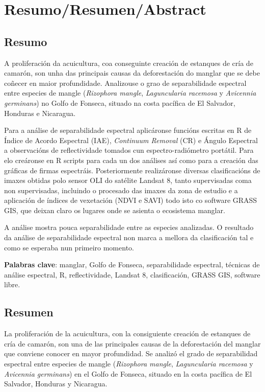 
\chapter*{Resumo/Resumen/Abstract}
\section*{Resumo}
A proliferación da acuicultura, coa conseguinte creación de estanques de cría de camarón, son unha das principais causas da deforestación do manglar que se debe coñecer en maior profundidade. Analizouse o grao de separabilidade espectral entre especies de mangle (\textit{Rizophora mangle}, \textit{Laguncularia racemosa} y \textit{Avicennia germinans}) no Golfo de Fonseca, situado na costa pacífica de El Salvador, Honduras e Nicaragua.

Para a análise de separabilidade espectral aplicáronse funcións escritas en R de Índice de Acordo Espectral (IAE), \textit{Continuum Removal} (CR) e Ángulo Espectral a observacións de reflectividade tomados cun espectro-radiómetro portátil. Para elo creáronse en R scripts para cada un dos análises así como para a creación das gráficas de firmas espectráis. Posteriormente realizáronse diversas clasificacións de imaxes obtidas polo sensor OLI do satélite Landsat 8, tanto supervisadas coma non supervisadas, incluindo o procesado das imaxes da zona de estudio e a aplicación de índices de vexetación (NDVI e SAVI) todo isto co software GRASS GIS, que deixan claro os lugares onde se asienta o ecosistema manglar.

A análise mostra pouca separabilidade entre as especies analizadas. O resultado da análise de separabilidade espectral non marca a mellora da clasificación tal e como se esperaba nun primeiro momento.

\noindent\textbf{Palabras clave}: manglar, Golfo de Fonseca, separabilidade espectral, técnicas de análise espectral, R, reflectividade, Landsat 8, clasificación, GRASS GIS, software libre.

\section*{Resumen}
La proliferación de la acuicultura, con la consiguiente creación de estanques de cría de camarón, son una de las principales causas de la deforestación del manglar que conviene conocer en mayor profundidad. Se analizó el grado de separabilidad espectral entre especies de mangle (\textit{Rizophora mangle}, \textit{Laguncularia racemosa} y \textit{Avicennia germinans}) en el Golfo de Fonseca, situado en la costa pacífica de El Salvador, Honduras y Nicaragua.

